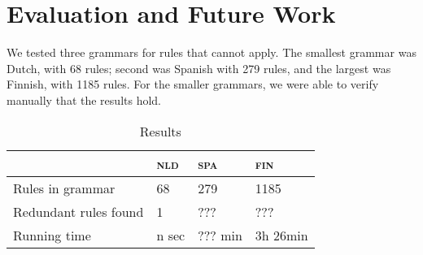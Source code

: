 \section{Evaluation and Future Work}

We tested three grammars for rules that cannot apply. The smallest grammar was Dutch, with 68 rules; second was Spanish with 279 rules, and the largest was Finnish, with 1185 rules.
For the smaller grammars, we were able to verify manually that the results hold.

\begin{table}[]
\centering
\begin{tabular}{|l|l|l|l|}
\hline
                         & \textsc{nld}  & \textsc{spa}  & \textsc{fin}  \\ \hline
Rules in grammar      & 68              & 279               & 1185              \\ \hline
Redundant rules found & 1               & ???               & ???    \\ \hline
Running time          & n sec           & ??? min           & 3h 26min    \\ \hline
\end{tabular}
\caption{Results}
\label{table:res}
\end{table}





